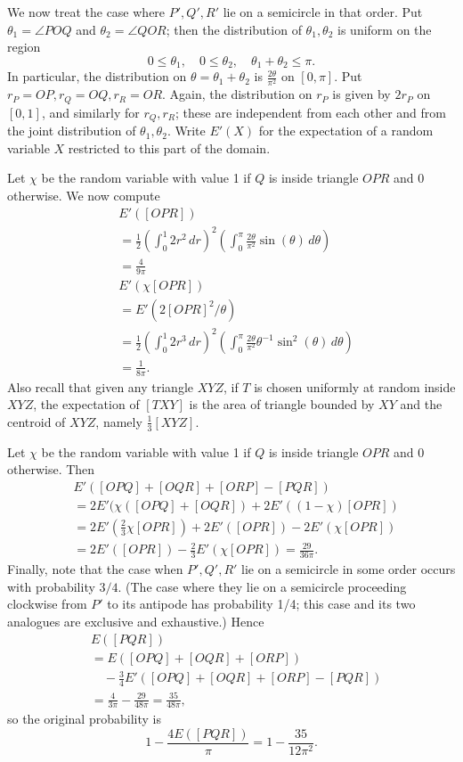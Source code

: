 \documentclass[amssymb,twocolumn,pra,10pt,aps]{revtex4-1}
\begin{document}
\begin{itemize}
We now treat the case where $P',Q',R'$ lie on a semicircle in
that order.
Put $\theta_1 = \angle POQ$ and $\theta_2 = \angle QOR$; then
the distribution of $\theta_1, \theta_2$ is uniform on the region
\[
0 \leq \theta_1, \quad 0 \leq \theta_2, \quad \theta_1 + \theta_2 \leq \pi.
\]
In particular, the distribution on $\theta = \theta_1 + \theta_2$
is $\frac{2\theta}{\pi^2}$ on $[0, \pi]$.
Put $r_P = OP, r_Q = OQ, r_R = OR$. Again, the distribution on $r_P$
is given by $2 r_P$ on $[0,1]$, and similarly for $r_Q, r_R$; these
are independent from each other and from the joint distribution
of $\theta_1,\theta_2$.
Write $E'(X)$ for the expectation of a random variable $X$
restricted to this part of the domain.

Let $\chi$ be the random variable with value 1 if $Q$ is inside
triangle $OPR$ and 0 otherwise.
We now compute
\begin{align*}
&E'([OPR]) \\
&=
\frac{1}{2} \left( \int_0^1 2r^2\,dr \right)^2
\left( \int_0^\pi \frac{2\theta}{\pi^2} \sin(\theta) \,d\theta \right)\\
&= \frac{4}{9 \pi} \\
& E'(\chi [OPR]) \\
&= E'(2 [OPR]^2 / \theta) \\
&=
\frac{1}{2} \left( \int_0^1 2r^3\,dr \right)^2
\left( \int_0^\pi \frac{2\theta}{\pi^2} \theta^{-1} \sin^2(\theta) \,d\theta \right)\\
&= \frac{1}{8\pi}.
\end{align*}
Also recall that given any triangle $XYZ$, if $T$ is chosen uniformly
at random inside $XYZ$, the expectation of $[TXY]$ is the area of
triangle bounded by $XY$ and the centroid of $XYZ$, namely
$\frac{1}{3} [XYZ]$.

Let $\chi$ be the random variable with value 1 if $Q$ is inside
triangle $OPR$ and 0 otherwise. Then
\begin{align*}
&E'([OPQ] + [OQR] + [ORP] - [PQR]) \\
&= 2 E'(\chi ([OPQ] + [OQR]) + 2 E'((1-\chi)[OPR]) \\
&= 2 E'(\frac{2}{3} \chi [OPR]) + 2 E'([OPR]) - 2 E'(\chi [OPR]) \\
&= 2E'([OPR]) - \frac{2}{3} E'(\chi [OPR]) = \frac{29}{36 \pi}.
\end{align*}
Finally, note that the case when $P',Q',R'$
lie on a semicircle in some order occurs with probability $3/4$.
(The case where they lie on a semicircle proceeding clockwise from $P'$
to its antipode has probability 1/4; this case and its two analogues are
exclusive and exhaustive.) Hence
\begin{align*}
&E([PQR]) \\
&= E([OPQ]+[OQR]+[ORP]) \\
&\quad - \frac{3}{4} E'([OPQ] + [OQR] + [ORP] - [PQR]) \\
&= \frac{4}{3 \pi} - \frac{29}{48 \pi} = \frac{35}{48 \pi},
\end{align*}
so the original probability is
\[
1 - \frac{4 E([PQR])}{\pi} = 1 - \frac{35}{12 \pi^2}.
\]


\end{itemize}
\end{document}
